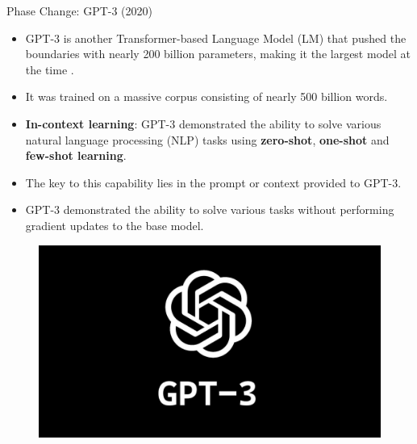 \documentclass[handout]{beamer}
\begin{document}
\begin{frame}{Phase Change: GPT-3 (2020)}
\begin{scriptsize}
\begin{itemize}
\item GPT-3 is another Transformer-based Language Model (LM) that pushed the boundaries with nearly 200 billion parameters, making it the largest model at the time \cite{brown2020language}.
\item It was trained on a massive corpus consisting of nearly 500 billion words.
\item \textbf{In-context learning}: GPT-3 demonstrated the ability to solve various natural language processing (NLP) tasks using \textbf{zero-shot}, \textbf{one-shot} and \textbf{few-shot learning}.
\item The key to this capability lies in the prompt or context provided to GPT-3.
\item GPT-3 demonstrated the ability to solve various tasks without performing gradient updates to the base model.
\end{itemize}
\end{scriptsize}

 \begin{figure}[h]
        	\includegraphics[scale = 0.08]{pics/gpt3.png}
        \end{figure}  



\end{frame}
\end{document}
